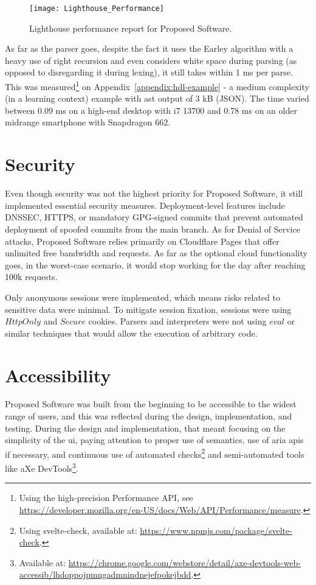 \begin{figure}[H]
    \centering
    \texttt{[image: Lighthouse\_Performance]}
    \caption{Lighthouse performance report for Proposed Software.}
    \label{fig:design-lighthouse-performance}
\end{figure}

As far as the parser goes, despite the fact it uses the Earley algorithm with a heavy use of right recursion and even considers white space during parsing (as opposed to disregarding it during lexing), it still takes within 1 ms per parse.
This was measured\footnote{Using the high-precision Performance API, see \url{https://developer.mozilla.org/en-US/docs/Web/API/Performance/measure}.} on Appendix~\ref{appendix:hdl-example} - a medium complexity (in a learning context) example with \gls{ast} output of 3 kB (JSON).
The time varied between 0.09 ms on a high-end desktop with i7 13700 and 0.78 ms on an older midrange smartphone with Snapdragon 662.

\section{Security}

Even though security was not the highest priority for Proposed Software, it still implemented essential security measures.
Deployment-level features include DNSSEC, HTTPS, or mandatory GPG-signed commits that prevent automated deployment of spoofed commits from the main branch.
As for Denial of Service attacks, Proposed Software relies primarily on Cloudflare Pages that offer unlimited free bandwidth and requests.
As far as the optional cloud functionality goes, in the worst-case scenario, it would stop working for the day after reaching 100k requests.

Only anonymous sessions were implemented, which means risks related to sensitive data were minimal.
To mitigate session fixation, sessions were using $HttpOnly$ and $Secure$ cookies.
Parsers and interpreters were not using $eval$ or similar techniques that would allow the execution of arbitrary code.

\section{Accessibility}

Proposed Software was built from the beginning to be accessible to the widest range of users, and this was reflected during the design, implementation, and testing.
During the design and implementation, that meant focusing on the simplicity of the \gls{ui}, paying attention to proper use of semantics, use of \gls{aria} \glspl{api} if necessary, and continuous use of automated checks\footnote{Using svelte-check, available at: \url{https://www.npmjs.com/package/svelte-check}.} and semi-automated tools like aXe DevTools\footnote{Available at: \url{https://chrome.google.com/webstore/detail/axe-devtools-web-accessib/lhdoppojpmngadmnindnejefpokejbdd}.}.

